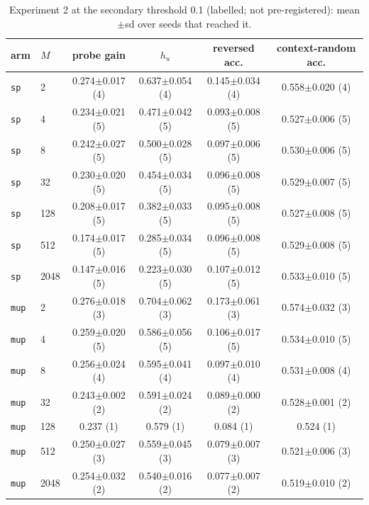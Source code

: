 \begin{table}[htbp]\centering\scriptsize
\caption{Experiment 2 at the secondary threshold 0.1 (labelled; not pre-registered): mean$\pm$sd over seeds that reached it.}\label{tab:exp2_010}
\begin{tabular}{llcccc}\toprule
arm & $M$ & probe gain & $h_u$ & reversed acc. & context-random acc. \\ \midrule
\texttt{sp} & 2 & 0.274$\pm$0.017 (4) & 0.637$\pm$0.054 (4) & 0.145$\pm$0.034 (4) & 0.558$\pm$0.020 (4) \\
\texttt{sp} & 4 & 0.234$\pm$0.021 (5) & 0.471$\pm$0.042 (5) & 0.093$\pm$0.008 (5) & 0.527$\pm$0.006 (5) \\
\texttt{sp} & 8 & 0.242$\pm$0.027 (5) & 0.500$\pm$0.028 (5) & 0.097$\pm$0.006 (5) & 0.530$\pm$0.006 (5) \\
\texttt{sp} & 32 & 0.230$\pm$0.020 (5) & 0.454$\pm$0.034 (5) & 0.096$\pm$0.008 (5) & 0.529$\pm$0.007 (5) \\
\texttt{sp} & 128 & 0.208$\pm$0.017 (5) & 0.382$\pm$0.033 (5) & 0.095$\pm$0.008 (5) & 0.527$\pm$0.008 (5) \\
\texttt{sp} & 512 & 0.174$\pm$0.017 (5) & 0.285$\pm$0.034 (5) & 0.096$\pm$0.008 (5) & 0.529$\pm$0.008 (5) \\
\texttt{sp} & 2048 & 0.147$\pm$0.016 (5) & 0.223$\pm$0.030 (5) & 0.107$\pm$0.012 (5) & 0.533$\pm$0.010 (5) \\
\midrule
\texttt{mup} & 2 & 0.276$\pm$0.018 (3) & 0.704$\pm$0.062 (3) & 0.173$\pm$0.061 (3) & 0.574$\pm$0.032 (3) \\
\texttt{mup} & 4 & 0.259$\pm$0.020 (5) & 0.586$\pm$0.056 (5) & 0.106$\pm$0.017 (5) & 0.534$\pm$0.010 (5) \\
\texttt{mup} & 8 & 0.256$\pm$0.024 (4) & 0.595$\pm$0.041 (4) & 0.097$\pm$0.010 (4) & 0.531$\pm$0.008 (4) \\
\texttt{mup} & 32 & 0.243$\pm$0.002 (2) & 0.591$\pm$0.024 (2) & 0.089$\pm$0.000 (2) & 0.528$\pm$0.001 (2) \\
\texttt{mup} & 128 & 0.237 (1) & 0.579 (1) & 0.084 (1) & 0.524 (1) \\
\texttt{mup} & 512 & 0.250$\pm$0.027 (3) & 0.559$\pm$0.045 (3) & 0.079$\pm$0.007 (3) & 0.521$\pm$0.006 (3) \\
\texttt{mup} & 2048 & 0.254$\pm$0.032 (2) & 0.540$\pm$0.016 (2) & 0.077$\pm$0.007 (2) & 0.519$\pm$0.010 (2) \\
\bottomrule
\end{tabular}\end{table}
